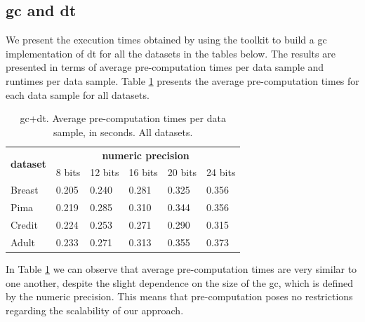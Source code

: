 \subsection{\acl{gc} and \acl{dt}}

We present the execution times obtained by using the toolkit to build a \ac{gc} implementation of \ac{dt} for all the datasets in the tables below. The results are presented in terms of average pre-computation times per data sample and runtimes per data sample. Table \ref{table:avgDTAllDatasets} presents the average pre-computation times for each data sample for all datasets.


\begin{table}[htp]
\centering
\caption{\acs{gc}+\acs{dt}. Average pre-computation times per data sample, in seconds. All datasets.}
\label{table:avgDTAllDatasets}
\begin{tabular}{|l|l|l|l|l|l|}
\hline
\multicolumn{1}{|c|}{\multirow{2}{*}{\textbf{dataset}}} & \multicolumn{5}{c|}{\textbf{numeric precision}}                                             \\ \cline{2-6} 
\multicolumn{1}{|c|}{}                                  & 8 bits & 12 bits & 16 bits & 20 bits & 24 bits \\ \hline
Breast                                                  & 0.205           & 0.240            & 0.281            & 0.325            & 0.356            \\ \hline
Pima                                                    & 0.219           & 0.285            & 0.310            & 0.344            & 0.356            \\ \hline
Credit                                                  & 0.224           & 0.253            & 0.271            & 0.290            & 0.315            \\ \hline
Adult                                                   & 0.233           & 0.271            & 0.313            & 0.355            & 0.373            \\ \hline
\end{tabular}
\end{table}


In Table \ref{table:avgDTAllDatasets} we can observe that average pre-computation times are very similar to one another, despite the slight dependence on the size of the \ac{gc}, which is defined by the numeric precision. This means that pre-computation poses no restrictions regarding the scalability of our approach.


